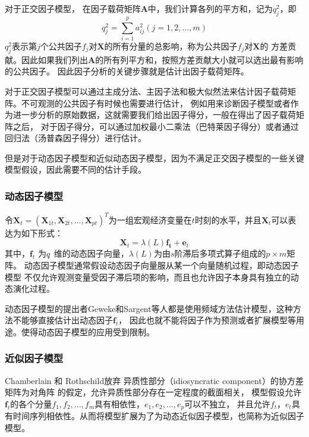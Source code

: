 对于正交因子模型，
在因子载荷矩阵$\bm{A}$中，我们计算各列的平方和，记为$q_j^2$，即
\begin{equation}
    q_j^2 = \sum_{i=1}^p a_{ij}^2 (j = 1, 2, ..., m)
\end{equation}
$q_j^2$表示第$j$个公共因子$f_j$对$\bm{X}$的所有分量的总影响，称为公共因子$f_j$对$\bm{X}$的
方差贡献。因此如果我们列出$\bm{A}$的所有列平方和，按照方差贡献大小就可以选出最有影响的公共因子。
因此因子分析的关键步骤就是估计出因子载荷矩阵。

对于正交因子模型可以通过主成分法、主因子法和极大似然法来估计因子载荷矩阵。不可观测的公共因子有时候也需要进行估计，
例如用来诊断因子模型或者作为进一步分析的原始数据，这就需要我们给出因子得分，一般在得出了因子载荷矩阵之后，
对于因子得分，可以通过加权最小二乘法（巴特莱因子得分）或者通过回归法（汤普森因子得分）进行估计。

但是对于动态因子模型和近似动态因子模型，因为不满足正交因子模型的一些关键模型假设，因此需要不同的估计手段。
\subsubsection{动态因子模型}

令$\bm{X}_t = (\bm{X}_{1t},\bm{X}_{2t}, ..., \bm{X}_{pt})^T$为一组宏观经济变量在$t$时刻的水平，并且$\bm{X}_t$可以表达为如下形式：
\begin{equation}
    \bm{X}_t = \lambda(L)\bm{f_t} + \bm{e}_t
\end{equation}
其中，$\bm{f}_t$ 为$q\time 1$ 维的动态因子向量，$\lambda(L)$为由$s$阶滞后多项式算子组成的$p \times m$矩阵。
动态因子模型通常假设动态因子向量服从某一个向量随机过程，即动态因子模型
不仅允许观测变量受因子滞后项的影响，而且也允许因子本身具有独立的动态演化过程。

动态因子模型的提出者Geweke和Sargent等人都是使用频域方法估计模型，这种方法不能够直接估计出动态因子$\bm{f}_t$，
因此也就不能将因子作为预测或者扩展模型等用途。使得动态因子模型的应用受到限制。

\subsubsection{近似因子模型}
Chamberlain 和 Rothschild放弃 异质性部分（idiosyncratic component）的协方差矩阵为对角阵 的假定，允许异质性部分存在一定程度的截面相关， 
模型假设允许$\bm f_t$的各个分量$f_1, f_2, ..., f_m$具有相依性，$e_1, e_2, ..., e_p$可以不独立，
并且允许$f_t$，$e_t$具有时间序列相依性。从而将模型扩展为了为动态近似因子模型，也简称为近似因子模型。

